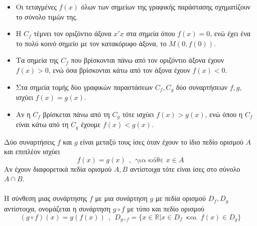 \documentclass[twoside,nofonts,ektypwsh,math,spyros]{frontisthrio}
\begin{document}
\begin{itemize}[itemsep=0mm]
\item Οι τεταγμένες $ f(x) $ όλων των σημείων της γραφικής παράστασης σχηματίζουν το σύνολο τιμών της.
\item Η $ C_f $ τέμνει τον οριζόντιο άξονα $ x'x $ στα σημεία όπου $ f(x)=0 $, ενώ έχει ένα το πολύ κοινό σημείο με τον κατακόρυφο άξονα, το $ M(0,f(0)) $.
\item Τα σημεία της $ C_f $ που βρίσκονται πάνω από τον οριζόντιο άξονα έχουν $ f(x)>0 $, ενώ όσα βρίσκονται κάτω από τον άξονα έχουν $ f(x)<0 $.
\item Στα σημεία τομής δύο γραφικών παραστάσεων $ C_f,C_g $ δύο συναρτήσεων $ f,g $, ισχύει $ f(x)=g(x) $.
\item Αν η $ C_f $ βρίσκεται πάνω από τη $ C_g $ τότε ισχύει $ f(x)>g(x) $, ενώ όπου η $ C_f $ είναι κάτω από τη $ C_g $ έχουμε $ f(x)<g(x) $.
\end{itemize}
Δύο συναρτήσεις $ f $ και $ g $ είναι μεταξύ τους ίσες όταν έχουν το ίδιο πεδίο ορισμού $ A $ και επιπλέον ισχύει
\[ f(x)=g(x)\ \ ,\ \ \textrm{για κάθε }x\in A \]
Αν έχουν διαφορετικά πεδία ορισμού $ A,B $ αντίστοιχα τότε είναι ίσες στο σύνολο $ A\cap B $.\\\\
Η σύνθεση μιας συνάρτησης $ f $ με μια συνάρτηση $ g $ με πεδία ορισμού $ D_f,D_g $ αντίστοιχα, ονομάζεται η συνάρτηση $ g\circ f $ με τύπο και πεδίο ορισμού
\[ (g\circ f)(x)=g(f(x))\ \ ,\ \ D_{g\circ f}=\{x\in\mathbb{R}| x\in D_f\ \textrm{ και }\ f(x)\in D_g\} \]
\begin{center}
\end{center}
\end{document}
